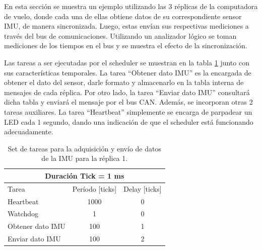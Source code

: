 
En esta sección se muestra un ejemplo utilizando las 3 réplicas de la computadora de vuelo, donde cada una de ellas obtiene datos de su correspondiente sensor IMU, de manera sincronizada. Luego, estas envían sus respectivas mediciones a través del bus de comunicaciones. Utilizando un analizador lógico se toman mediciones de los tiempos en el bus y se muestra el efecto de la sincronización.


Las tareas a ser ejecutadas por el scheduler se muestran en la tabla \ref{tab:schedule_adquisicion_IMU} junto con sus características temporales. La tarea ``Obtener dato IMU'' es la encargada de obtener el dato del sensor, darle formato y almacenarlo en la tabla interna de mensajes de cada réplica. Por otro lado, la tarea ``Enviar dato IMU'' consultará dicha tabla y enviará el mensaje por el bus CAN. Además, se incorporan otras 2 tareas auxiliares. La tarea ``Heartbeat'' simplemente se encarga de parpadear un LED cada 1 segundo, dando una indicación de que el scheduler está funcionando adecuadamente.

\begin{table}[H]
    \centering
    \begin{tabular}{|l|c|c|}
        \hline
        \multicolumn{3}{|c|}{Duración Tick = 1 ms}\\
        \hline
        Tarea & Período [ticks] & Delay [ticks]\\
        \hline
        Heartbeat        & 1000 & 0 \\
        Watchdog         & 1    & 0 \\ 
        Obtener dato IMU & 100  & 1 \\
        Enviar dato IMU  & 100  & 2 \\
        \hline
    \end{tabular}
    \caption{Set de tareas para la adquisición y envío de datos de la IMU para la réplica 1.}
    \label{tab:schedule_adquisicion_IMU}
\end{table}

